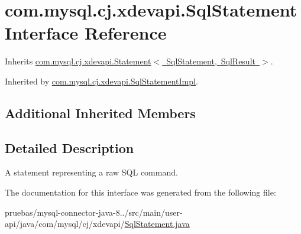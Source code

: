 \hypertarget{interfacecom_1_1mysql_1_1cj_1_1xdevapi_1_1_sql_statement}{}\section{com.\+mysql.\+cj.\+xdevapi.\+Sql\+Statement Interface Reference}
\label{interfacecom_1_1mysql_1_1cj_1_1xdevapi_1_1_sql_statement}


Inherits \mbox{\hyperlink{interfacecom_1_1mysql_1_1cj_1_1xdevapi_1_1_statement}{com.\+mysql.\+cj.\+xdevapi.\+Statement$<$ Sql\+Statement, Sql\+Result $>$}}.



Inherited by \mbox{\hyperlink{classcom_1_1mysql_1_1cj_1_1xdevapi_1_1_sql_statement_impl}{com.\+mysql.\+cj.\+xdevapi.\+Sql\+Statement\+Impl}}.

\subsection*{Additional Inherited Members}


\subsection{Detailed Description}
A statement representing a raw S\+QL command. 

The documentation for this interface was generated from the following file\+:\begin{DoxyCompactItemize}
\item 
pruebas/mysql-\/connector-\/java-\/8../src/main/user-\/api/java/com/mysql/cj/xdevapi/\mbox{\hyperlink{_sql_statement_8java}{Sql\+Statement.\+java}}\end{DoxyCompactItemize}
